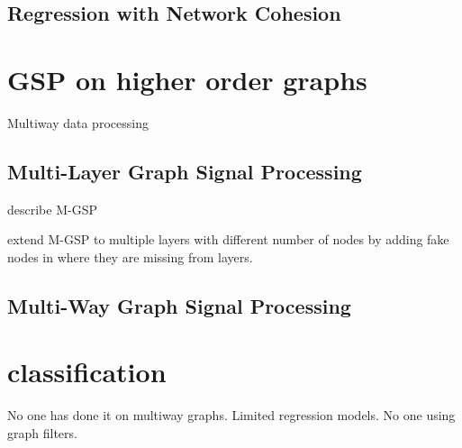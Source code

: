 \subsection{Regression with Network Cohesion}

\cite{Le2022}

\cite{Li2019}

\section{GSP on higher order graphs}

Multiway data processing 

\cite{Smilde2004}
\cite{Kroonenberg2008}


\cite{Ji2019}

\cite{Cammoun2009}




\subsection{Multi-Layer Graph Signal Processing}

\cite{Zhang2022} describe M-GSP 

\cite{Zhang2018} extend M-GSP to multiple layers with different number of nodes by adding fake nodes in where they are missing from layers. 
 

\subsection{Multi-Way Graph Signal Processing}


\cite{Zhao2023}

\cite{Li2012}



\section{classification}

\cite{Tran2020}

No one has done it on multiway graphs. Limited regression models. No one using graph filters. 